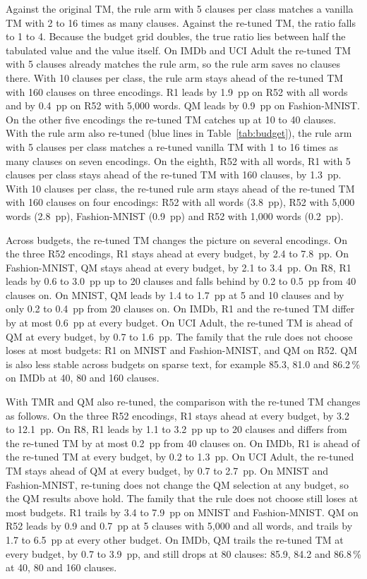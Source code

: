 \documentclass[preprint,12pt,times]{elsarticle}
\newcommand{\add}[1]{{\color{blue}#1}}
\begin{document}
Against the original TM, the rule arm with 5 clauses per class matches a vanilla TM with 2 to 16 times as many clauses.
Against the re-tuned TM, the ratio falls to 1 to 4.
Because the budget grid doubles, the true ratio lies between half the tabulated value and the value itself.
On IMDb and UCI Adult the re-tuned TM with 5 clauses already matches the rule arm, so the rule arm saves no clauses there.
With 10 clauses per class, the rule arm stays ahead of the re-tuned TM with 160 clauses on three encodings.
R1 leads by 1.9~pp on R52 with all words and by 0.4~pp on R52 with 5,000 words.
QM leads by 0.9~pp on Fashion-MNIST.
On the other five encodings the re-tuned TM catches up at 10 to 40 clauses.
\add{With the rule arm also re-tuned (blue lines in Table~\ref{tab:budget}), the rule arm with 5 clauses per class matches a re-tuned vanilla TM with 1 to 16 times as many clauses on seven encodings.
On the eighth, R52 with all words, R1 with 5 clauses per class stays ahead of the re-tuned TM with 160 clauses, by 1.3~pp.
With 10 clauses per class, the re-tuned rule arm stays ahead of the re-tuned TM with 160 clauses on four encodings: R52 with all words (3.8~pp), R52 with 5,000 words (2.8~pp), Fashion-MNIST (0.9~pp) and R52 with 1,000 words (0.2~pp).}

Across budgets, the re-tuned TM changes the picture on several encodings.
On the three R52 encodings, R1 stays ahead at every budget, by 2.4 to 7.8~pp.
On Fashion-MNIST, QM stays ahead at every budget, by 2.1 to 3.4~pp.
On R8, R1 leads by 0.6 to 3.0~pp up to 20 clauses and falls behind by 0.2 to 0.5~pp from 40 clauses on.
On MNIST, QM leads by 1.4 to 1.7~pp at 5 and 10 clauses and by only 0.2 to 0.4~pp from 20 clauses on.
On IMDb, R1 and the re-tuned TM differ by at most 0.6~pp at every budget.
On UCI Adult, the re-tuned TM is ahead of QM at every budget, by 0.7 to 1.6~pp.
The family that the rule does not choose loses at most budgets: R1 on MNIST and Fashion-MNIST, and QM on R52.
QM is also less stable across budgets on sparse text, for example 85.3, 81.0 and 86.2\,\% on IMDb at 40, 80 and 160 clauses.

\add{With TMR and QM also re-tuned, the comparison with the re-tuned TM changes as follows.
On the three R52 encodings, R1 stays ahead at every budget, by 3.2 to 12.1~pp.
On R8, R1 leads by 1.1 to 3.2~pp up to 20 clauses and differs from the re-tuned TM by at most 0.2~pp from 40 clauses on.
On IMDb, R1 is ahead of the re-tuned TM at every budget, by 0.2 to 1.3~pp.
On UCI Adult, the re-tuned TM stays ahead of QM at every budget, by 0.7 to 2.7~pp.
On MNIST and Fashion-MNIST, re-tuning does not change the QM selection at any budget, so the QM results above hold.
The family that the rule does not choose still loses at most budgets.
R1 trails by 3.4 to 7.9~pp on MNIST and Fashion-MNIST.
QM on R52 leads by 0.9 and 0.7~pp at 5 clauses with 5,000 and all words, and trails by 1.7 to 6.5~pp at every other budget.
On IMDb, QM trails the re-tuned TM at every budget, by 0.7 to 3.9~pp, and still drops at 80 clauses: 85.9, 84.2 and 86.8\,\% at 40, 80 and 160 clauses.}
\end{document}
